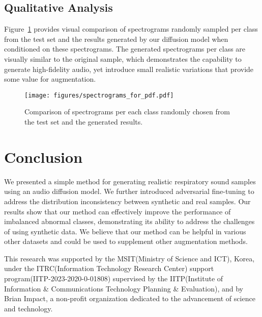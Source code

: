 \documentclass{article}
\begin{document}
\subsection{Qualitative Analysis}
Figure~\ref{fig:fig2} provides visual comparison of spectrograms randomly sampled per class from the test set and the results generated by our diffusion model when conditioned on these spectrograms. The generated spectrograms per class are visually similar to the original sample, which demonstrates the capability to generate high-fidelity audio, yet introduce small realistic variations that provide some value for augmentation.

\begin{figure}[!ht]
    \centering
    \texttt{[image: figures/spectrograms\_for\_pdf.pdf]} 
    \caption{Comparison of spectrograms per each class randomly chosen from the test set and the generated results.}
    \label{fig:fig2}
\end{figure}


\section{Conclusion}
We presented a simple method for generating realistic respiratory sound samples using an audio diffusion model. 
We further introduced adversarial fine-tuning to address the distribution inconsistency between synthetic and real samples. 
Our results show that our method can effectively improve the performance of imbalanced abnormal classes, demonstrating its ability to address the challenges of using synthetic data.
We believe that our method can be helpful in various other datasets and could be used to supplement other augmentation methods.









\begin{ack}
This research was supported by the MSIT(Ministry of Science and ICT), Korea, under the ITRC(Information Technology Research Center) support program(IITP-2023-2020-0-01808) supervised by the IITP(Institute of Information \& Communications Technology Planning \& Evaluation), and by Brian Impact, a non-profit organization dedicated to the advancement of science and technology.

\end{ack}




\end{document}
